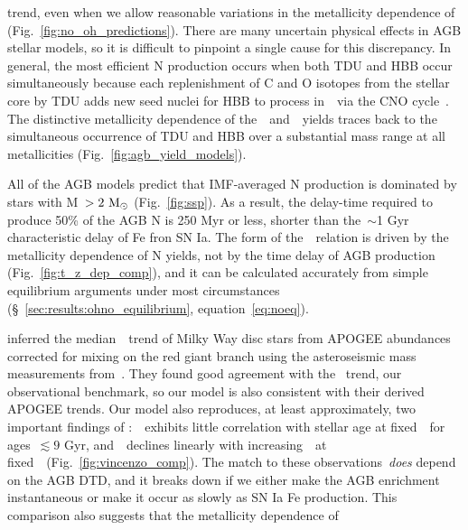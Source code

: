 \documentclass[ms.tex]{subfiles}
\begin{document}
\citet{Dopita2016} trend, even when we allow reasonable variations in the
metallicity dependence of~ (Fig.~\ref{fig:no_oh_predictions}).
There are many uncertain physical effects in AGB stellar models, so it is
difficult to pinpoint a single cause for this discrepancy.
In general, the most efficient N production occurs when both TDU and HBB occur
simultaneously because each replenishment of C and O isotopes from the stellar
core by TDU adds new seed nuclei for HBB to process in~\Nfourteen~via the CNO
cycle~\citep{Ventura2013}.
The distinctive metallicity dependence of the~\karakasten~and~\karakas~yields
traces back to the simultaneous occurrence of TDU and HBB over a substantial
mass range at all metallicities (Fig.~\ref{fig:agb_yield_models}).
\par
All of the AGB models predict that IMF-averaged N production is dominated by
stars with M~$> 2~\text{M}_\odot$ (Fig.~\ref{fig:ssp}).
As a result, the delay-time required to produce 50\% of the AGB N is 250 Myr or
less, shorter than the~$\sim$1 Gyr characteristic delay of Fe fron SN Ia.
The form of the~\ohno~relation is driven by the metallicity dependence of N
yields, not by the time delay of AGB production (Fig.~\ref{fig:t_z_dep_comp}),
and it can be calculated accurately from simple equilibrium arguments under
most circumstances (\S~\ref{sec:results:ohno_equilibrium},
equation~\ref{eq:noeq}).
\par
\citet{Vincenzo2021} inferred the median~\ohno~trend of Milky Way disc stars
from APOGEE abundances corrected for mixing on the red giant branch using the
asteroseismic mass measurements from~\citet{Miglio2021}.
They found good agreement with the~\citet{Dopita2016} trend, our observational
benchmark, so our model is also consistent with their derived APOGEE trends.
Our model also reproduces, at least approximately, two important findings of
\citet{Vincenzo2021}:~\no~exhibits little correlation with stellar age at
fixed~\feh~for ages~$\lesssim 9$ Gyr, and~\no~declines linearly with
increasing~\ofe~at fixed~\oh~(Fig.~\ref{fig:vincenzo_comp}).
The match to these observations~\textit{does} depend on the AGB DTD, and it
breaks down if we either make the AGB enrichment instantaneous or make it occur
as slowly as SN Ia Fe production.
This comparison also suggests that the metallicity dependence of
\end{document}
